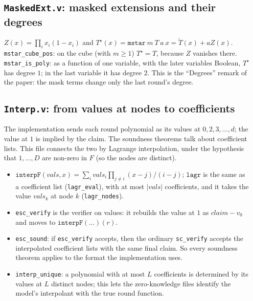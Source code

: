 \documentclass[11pt,a4paper]{article}
\newcommand{\mle}[1]{\widetilde{#1}}
\newcommand{\msk}[1]{#1^{\star}}
\theoremstyle{definition}
\theoremstyle{plain}
\begin{document}
\subsection{\texttt{MaskedExt.v}: masked extensions and their degrees}

$Z(x)=\prod_ix_i(1-x_i)$ and $\msk T(x)=\mathtt{mstar}\ m\ T\ a\ x=\mle T(x)+aZ(x)$.
\texttt{mstar\_cube\_pos}: on the cube (with $m\ge1$) $\msk T=T$, because $Z$ vanishes there.
\texttt{mstar\_is\_poly}: as a function of one variable, with the later variables Boolean, $\msk T$
has degree $1$; in the last variable it has degree $2$. This is the ``Degrees'' remark of the
paper: the mask terms change only the last round's degree.

\subsection{\texttt{Interp.v}: from values at nodes to coefficients}

The implementation sends each round polynomial as its values at $0,2,3,\dots,d$; the value at $1$
is implied by the claim. The soundness theorems talk about coefficient lists. This file connects
the two by Lagrange interpolation, under the hypothesis that $1,\dots,D$ are non-zero in $F$ (so the
nodes are distinct).
\begin{itemize}[leftmargin=1.3em]
\item $\mathtt{interpF}(vals,x)=\sum_i vals_i\prod_{j\ne i}(x-j)/(i-j)$; $\mathtt{lagr}$ is the same
  as a coefficient list (\texttt{lagr\_eval}), with at most $|vals|$ coefficients, and it takes the
  value $vals_k$ at node $k$ (\texttt{lagr\_nodes}).
\item \texttt{esc\_verify} is the verifier on values: it rebuilds the value at $1$ as
  $\mathit{claim}-v_0$ and moves to $\mathtt{interpF}(\dots)(r)$.
\item \texttt{esc\_sound}: if \texttt{esc\_verify} accepts, then the ordinary \texttt{sc\_verify}
  accepts the interpolated coefficient lists with the same final claim. So every soundness theorem
  applies to the format the implementation uses.
\item \texttt{interp\_unique}: a polynomial with at most $L$ coefficients is determined by its values
  at $L$ distinct nodes; this lets the zero-knowledge files identify the model's interpolant with
  the true round function.
\end{itemize}

\end{document}

